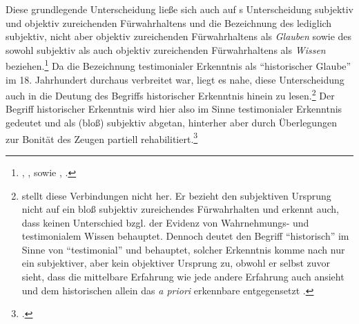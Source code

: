 Diese grundlegende Unterscheidung ließe sich auch auf s
Unterscheidung subjektiv und objektiv zureichenden Fürwahrhaltens und die
Bezeichnung des lediglich subjektiv, nicht aber objektiv zureichenden
Fürwahrhaltens als \emph{Glauben} sowie des sowohl subjektiv als auch objektiv
zureichenden Fürwahrhaltens als \emph{Wissen} beziehen.\footnote{\cite[Vgl.][B
850]{Kant:KritikderreinenVernunft2003}, \cite[][III:
532.36--533.5]{Kant:GesammelteWerke1900ff.}, sowie \cite[][A 98--107]{Kant:ImmanuelKantsLogik1977},
\cite[][IX: 65.33--70.31]{Kant:GesammelteWerke1900ff.}.} Da die Bezeichnung
testimonialer Erkenntnis als \enquote{historischer Glaube} im 18. Jahrhundert durchaus
verbreitet war, liegt es nahe, diese Unterscheidung auch in die Deutung des
Begriffs historischer Erkenntnis hinein zu
lesen.\footnote{ stellt diese
Verbindungen nicht her. Er bezieht den subjektiven Ursprung nicht auf ein bloß
subjektiv zureichendes Fürwahrhalten und erkennt auch, dass
 keinen Unterschied bzgl. der Evidenz von Wahrnehmungs-
und testimonialem Wissen behauptet. Dennoch deutet
 den Begriff \enquote{historisch}
im Sinne von \enquote{testimonial} und behauptet, solcher Erkenntnis komme nach
 nur ein subjektiver, aber kein objektiver Ursprung zu,
obwohl er selbst zuvor sieht, dass  die mittelbare
Erfahrung wie jede andere Erfahrung auch ansieht und dem historischen allein das
\emph{a priori} erkennbare
entgegensetzt \parencite[siehe][140]{Kater:PolitikRechtGeschichte1999}.} Der
Begriff historischer Erkenntnis wird hier also im Sinne testimonialer Erkenntnis
gedeutet und als (bloß) subjektiv abgetan, hinterher aber durch Überlegungen zur
Bonität des Zeugen partiell
rehabilitiert.\footnote{\cite[Vgl.][143--146]{Kater:PolitikRechtGeschichte1999}.}


